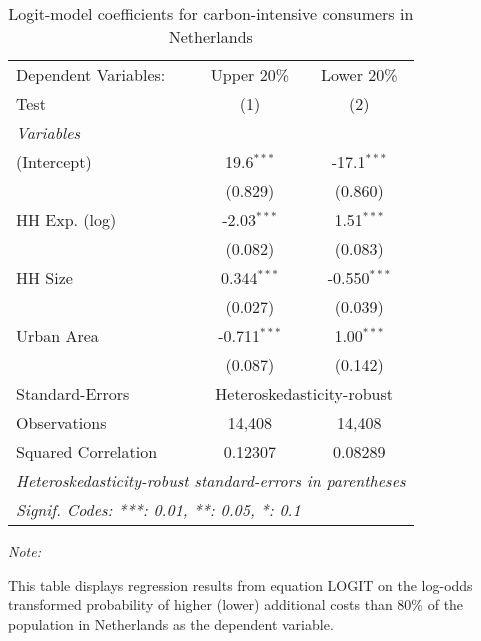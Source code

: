 
\begin{table}[htbp!]
   \centering
   \small
   \begin{adjustbox}{width = 1\textwidth, max height = 0.95\textheight, center}
      \begin{threeparttable}[b]
         \caption{\label{tab:Logit_1_NLD} Logit-model coefficients for carbon-intensive consumers in Netherlands}
         \begin{tabular}{lcc}
            \tabularnewline \midrule \midrule
            Dependent Variables: & Upper 20\%     & Lower 20\%\\   
            Test                 & (1)            & (2)\\  
            \midrule
            \emph{Variables}\\
            (Intercept)          & 19.6$^{***}$   & -17.1$^{***}$\\   
                                 & (0.829)        & (0.860)\\   
            HH Exp. (log)        & -2.03$^{***}$  & 1.51$^{***}$\\   
                                 & (0.082)        & (0.083)\\   
            HH Size              & 0.344$^{***}$  & -0.550$^{***}$\\   
                                 & (0.027)        & (0.039)\\   
            Urban Area           & -0.711$^{***}$ & 1.00$^{***}$\\   
                                 & (0.087)        & (0.142)\\   
            \midrule 
            Standard-Errors & \multicolumn{2}{c}{Heteroskedasticity-robust} \\ 
            Observations         & 14,408         & 14,408\\  
            Squared Correlation  & 0.12307        & 0.08289\\  
            \midrule \midrule
            \multicolumn{3}{l}{\emph{Heteroskedasticity-robust standard-errors in parentheses}}\\
            \multicolumn{3}{l}{\emph{Signif. Codes: ***: 0.01, **: 0.05, *: 0.1}}\\
         \end{tabular}
         
         \begin{tablenotes}\item \medskip \textit{Note:}
            \item This table displays regression results from equation LOGIT on the log-odds transformed probability of higher (lower) additional costs than 80\% of the population in Netherlands as the dependent variable. 
         \end{tablenotes}
      \end{threeparttable}
   \end{adjustbox}
\end{table}


